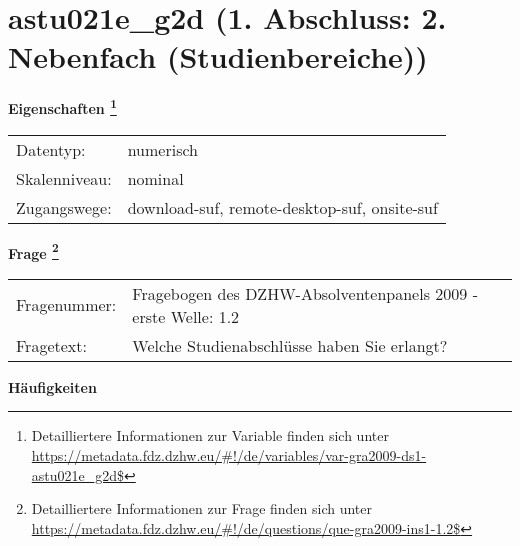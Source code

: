 
    \setcounter{footnote}{0}

    \vspace*{-1.8cm}
	\section{astu021e\_g2d (1. Abschluss: 2. Nebenfach (Studienbereiche))}
	\label{section:astu021e_g2d}



    \vspace*{0.5cm}
    \noindent\textbf{Eigenschaften
	\footnote{Detailliertere Informationen zur Variable finden sich unter
		\url{https://metadata.fdz.dzhw.eu/\#!/de/variables/var-gra2009-ds1-astu021e_g2d$}}}\\
	\begin{tabularx}{\hsize}{@{}lX}
	Datentyp: & numerisch \\
	Skalenniveau: & nominal \\
	Zugangswege: &
	  download-suf, 
	  remote-desktop-suf, 
	  onsite-suf
 \\
    \end{tabularx}



				\vspace*{0.5cm}
                \noindent\textbf{Frage
	                \footnote{Detailliertere Informationen zur Frage finden sich unter
		              \url{https://metadata.fdz.dzhw.eu/\#!/de/questions/que-gra2009-ins1-1.2$}}}\\
				\begin{tabularx}{\hsize}{@{}lX}
					Fragenummer: &
					  Fragebogen des DZHW-Absolventenpanels 2009 - erste Welle:
					  1.2
 \\
					Fragetext: & Welche Studienabschlüsse haben Sie erlangt? \\
				\end{tabularx}





        		\vspace*{0.5cm}
                \noindent\textbf{Häufigkeiten}

